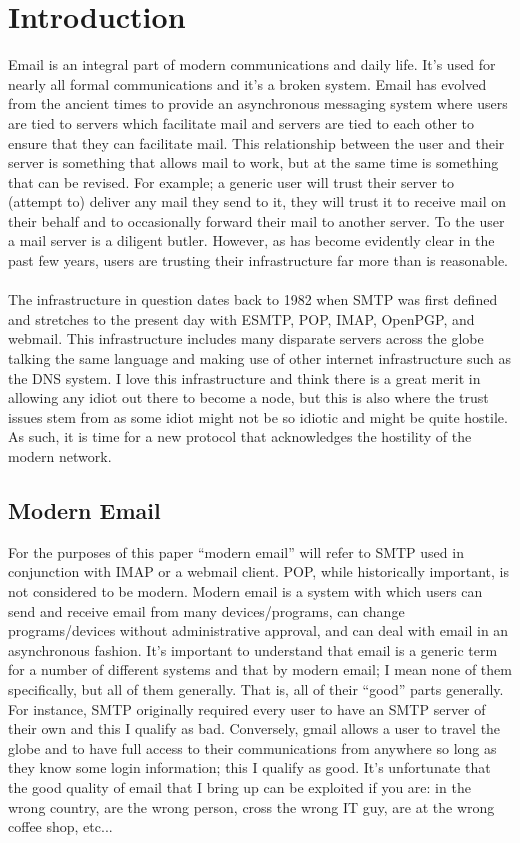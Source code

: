 \section{Introduction}
Email is an integral part of modern communications and daily life. It's used for nearly all formal communications and it's a broken system. Email has evolved from the ancient times to provide an asynchronous messaging system where users are tied to servers which facilitate mail and servers are tied to each other to ensure that they can facilitate mail. This relationship between the user and their server is something that allows mail to work, but at the same time is something that can be revised. For example; a generic user will trust their server to (attempt to) deliver any mail they send to it, they will trust it to receive mail on their behalf and to occasionally forward their mail to another server. To the user a mail server is a diligent butler. However, as has become evidently clear in the past few years, users are trusting their infrastructure far more than is reasonable.
\paragraph{}
The infrastructure in question dates back to 1982 when SMTP was first defined and stretches to the present day with ESMTP, POP, IMAP, OpenPGP, and webmail\cite{rfc821}. This infrastructure includes many disparate servers across the globe talking the same language and making use of other internet infrastructure such as the DNS system. I love this infrastructure and think there is a great merit in allowing any idiot out there to become a node, but this is also where the trust issues stem from as some idiot might not be so idiotic and might be quite hostile. As such, it is time for a new protocol that acknowledges the hostility of the modern network.
\subsection{Modern Email}
For the purposes of this paper ``modern email'' will refer to SMTP used in conjunction with IMAP or a webmail client. POP, while historically important, is not considered to be modern. Modern email is a system with which users can send and receive email from many devices/programs, can change programs/devices without administrative approval, and can deal with email in an asynchronous fashion. It's important to understand that email is a generic term for a number of different systems and that by modern email; I mean none of them specifically, but all of them generally. That is, all of their ``good'' parts generally. For instance, SMTP originally required every user to have an SMTP server of their own and this I qualify as bad. Conversely, gmail allows a user to travel the globe and to have full access to their communications from anywhere so long as they know some login information; this I qualify as good. It's unfortunate that the good quality of email that I bring up can be exploited if you are: in the wrong country, are the wrong person, cross the wrong IT guy, are at the wrong coffee shop, etc...
